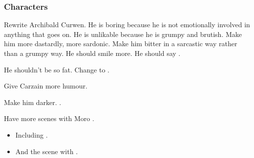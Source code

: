 \subsubsection{Characters}
\begin{changes}
  \begin{comment}\paragraph{Archibald Curwen}\end{comment}
    Rewrite Archibald Curwen. 
    He is boring because he is not emotionally involved in anything that goes on. 
    He is unlikable because he is grumpy and brutish. 
    Make him more dastardly, more sardonic. 
    Make him bitter in a sarcastic way rather than a grumpy way. 
    He should smile more. 
    He should say \quo{\Mister \Shireyo}. 
    
    He shouldn't be so fat. 
    Change  to . 
  
  \begin{comment}
  \paragraph{Carzain \Shachar}
  \end{comment}
    Give Carzain more humour.
  
  \begin{comment}
    \paragraph{\LocarPsyrex}
  \end{comment}
  \changesitem{\LocarPsyrex} 
    Make him darker.
    .
  
  \begin{comment}
  \paragraph{Moro \Cobrel}
  \end{comment}
    Have more scenes with Moro \Cobrel.
    \begin{itemize}
      \item 
        Including . 
      \item 
        And the scene with . 
    \end{itemize}
  

\end{changes}
